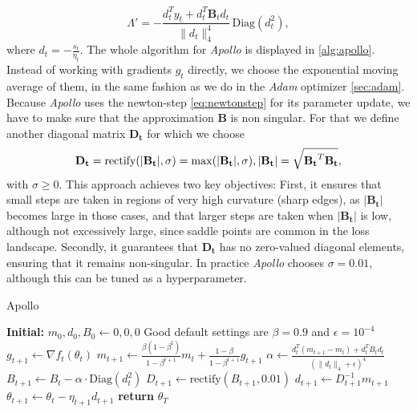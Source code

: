 \begin{equation}
    \Lambda' = - \frac{d_t^T y_t + d_t^T \mathbf{B}_t d_t}{\|d_t\|_4^4} \, \text{Diag}(d_t^2),
\end{equation}
where \( d_t = - \frac{s_t}{\eta_t} \). The whole algorithm for \emph{Apollo} is displayed in \ref{alg:apollo}.
Instead of working with gradients \( g_t \) directly, we choose the exponential moving average of them, in the
same fashion as we do in the \emph{Adam} optimizer \ref{sec:adam}. Because \emph{Apollo} uses the newton-step \ref{eq:newtonstep}
for its parameter update, we have to make sure that the approximation $ \mathbf{B}$ is non singular.
For that we define another diagonal matrix $ \mathbf{D_t}$ for which we choose
\begin{equation}
    \mathbf{D_t} =  \text{rectify}(|\mathbf{B_t}|,\sigma) = \max(|\mathbf{B_t}|,\sigma), \\ |\mathbf{B_t}| = \sqrt{\mathbf{B_t}^T\mathbf{B_t}},
\end{equation}
with $\sigma \geq 0$.
This approach achieves two key objectives: First, it ensures that small steps are taken in regions of very high curvature (sharp edges),
as \( |\mathbf{B_t}| \) becomes large in those cases, and that larger steps are taken when \( |\mathbf{B_t}| \) is low, although not excessively large, since saddle points are common in the loss landscape.
Secondly, it guarantees that \( \mathbf{D_t} \) has no zero-valued diagonal elements, ensuring that it remains non-singular.
In practice \emph{Apollo} chooses $\sigma=0.01$, although this can be tuned as a hyperparameter.\cite{apollo}

\label{alg:apollo}
\begin{algorithm}
    \caption{Apollo}
    \begin{algorithmic}[1]
    \State \textbf{Initial:} $m_0, d_0, B_0 \leftarrow 0, 0, 0$ 
    \State Good default settings are $\beta = 0.9$ and $\epsilon = 10^{-4}$
            \State $g_{t+1} \leftarrow \nabla f_t(\theta_t)$ 
            \State $m_{t+1} \leftarrow \frac{\beta(1-\beta^t)}{1-\beta^{t+1}}m_t + \frac{1-\beta}{1-\beta^{t+1}}g_{t+1}$ 
            \State $\alpha \leftarrow \frac{d_t^T(m_{t+1}-m_t)+d_t^TB_td_t}{(\|d_t\|_4+\epsilon)^4}$ 
            \State $B_{t+1} \leftarrow B_t - \alpha \cdot \text{Diag}(d_t^2)$ 
            \State $D_{t+1} \leftarrow \text{rectify}(B_{t+1}, 0.01)$ 
            \State $d_{t+1} \leftarrow D_{t+1}^{-1}m_{t+1}$ 
            \State $\theta_{t+1} \leftarrow \theta_t - \eta_{t+1}d_{t+1}$ 
        \EndFor
    \EndWhile
    \State \textbf{return} $\theta_T$
    \end{algorithmic}
    \end{algorithm}

